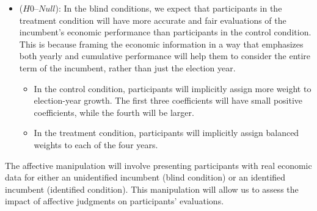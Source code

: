 \documentclass[
]{article}
\providecommand{\tightlist}{%
  \setlength{\itemsep}{0pt}\setlength{\parskip}{0pt}}
\begin{document}
\begin{itemize}
\tightlist
\item
  (\(H0 – Null\)): In the blind conditions, we expect that participants
  in the treatment condition will have more accurate and fair
  evaluations of the incumbent's economic performance than participants
  in the control condition. This is because framing the economic
  information in a way that emphasizes both yearly and cumulative
  performance will help them to consider the entire term of the
  incumbent, rather than just the election year.

  \begin{itemize}
  \tightlist
  \item
    In the control condition, participants will implicitly assign more
    weight to election-year growth. The first three coefficients will
    have small positive coefficients, while the fourth will be larger.
  \item
    In the treatment condition, participants will implicitly assign
    balanced weights to each of the four years.
  \end{itemize}
\end{itemize}

The affective manipulation will involve presenting participants with
real economic data for either an unidentified incumbent (blind
condition) or an identified incumbent (identified condition). This
manipulation will allow us to assess the impact of affective judgments
on participants' evaluations.
\end{document}
